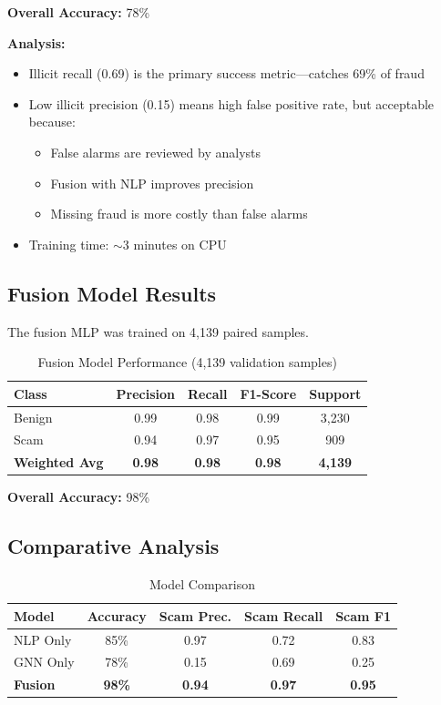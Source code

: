 \textbf{Overall Accuracy:} 78\%

\textbf{Analysis:}
\begin{itemize}
    \item Illicit recall (0.69) is the primary success metric—catches 69\% of fraud
    \item Low illicit precision (0.15) means high false positive rate, but acceptable because:
    \begin{itemize}
        \item False alarms are reviewed by analysts
        \item Fusion with NLP improves precision
        \item Missing fraud is more costly than false alarms
    \end{itemize}
    \item Training time: $\sim$3 minutes on CPU
\end{itemize}

\subsection{Fusion Model Results}

The fusion MLP was trained on 4,139 paired samples.

\begin{table}[h]
\centering
\caption{Fusion Model Performance (4,139 validation samples)}
\label{tab:fusion_results}
\begin{tabular}{lcccc}
\toprule
\textbf{Class} & \textbf{Precision} & \textbf{Recall} & \textbf{F1-Score} & \textbf{Support} \\
\midrule
Benign & 0.99 & 0.98 & 0.99 & 3,230 \\
Scam & 0.94 & 0.97 & 0.95 & 909 \\
\midrule
\textbf{Weighted Avg} & \textbf{0.98} & \textbf{0.98} & \textbf{0.98} & \textbf{4,139} \\
\bottomrule
\end{tabular}
\end{table}

\textbf{Overall Accuracy:} 98\%

\subsection{Comparative Analysis}

\begin{table}[h]
\centering
\caption{Model Comparison}
\label{tab:comparison}
\begin{tabular}{lcccc}
\toprule
\textbf{Model} & \textbf{Accuracy} & \textbf{Scam Prec.} & \textbf{Scam Recall} & \textbf{Scam F1} \\
\midrule
NLP Only & 85\% & 0.97 & 0.72 & 0.83 \\
GNN Only & 78\% & 0.15 & 0.69 & 0.25 \\
\textbf{Fusion} & \textbf{98\%} & \textbf{0.94} & \textbf{0.97} & \textbf{0.95} \\
\bottomrule
\end{tabular}
\end{table}

